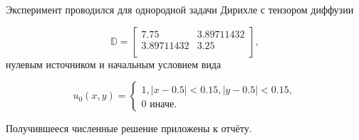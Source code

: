 \documentclass{report}
\begin{document}
Эксперимент проводился для однородной задачи Дирихле с тензором диффузии

\[
\mathbb{D}=
\begin{bmatrix}
	7.75 & 3.89711432 \\
	3.89711432 & 3.25 \\
\end{bmatrix},
\]
нулевым источником и начальным условием вида

$$
u_0(x,y)=
\begin{cases}
	1, |x-0.5|<0.15, |y - 0.5| < 0.15, \\
	0 \text{~иначе}.
\end{cases}
$$

Получившееся численные решение приложены к отчёту.
\end{document}

